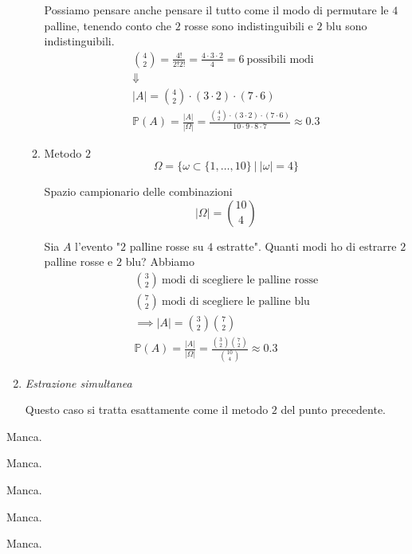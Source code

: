 \begin{enumerate}
\begin{enumerate}
\begin{oss}
Possiamo pensare anche pensare il tutto come il modo di permutare le $4$ palline, tenendo conto che $2$ rosse sono indistinguibili e $2$ blu sono indistinguibili.\begin{gather*}
\binom{4}{2} =\frac{4!}{2!2!} =\frac{4\cdot 3\cdot 2}{4} =6\ \text{possibili modi}\\
\Downarrow \\
| A| =\binom{4}{2} \cdot ( 3\cdot 2) \cdot ( 7\cdot 6)\\
\mathbb{P}( A) =\frac{| A| }{| \Omega | } =\frac{\binom{4}{2} \cdot ( 3\cdot 2) \cdot ( 7\cdot 6)}{10\cdot 9\cdot 8\cdot 7} \approx 0.3
\end{gather*}
\end{oss}
\item Metodo $2$\begin{equation*}
\Omega =\{\omega \subset \{1,\dotsc ,10\} \ |\ | \omega | =4\}
\end{equation*}

Spazio campionario delle combinazioni\begin{equation*}
| \Omega | =\binom{10}{4}
\end{equation*}

Sia $A$ l'evento "$2$ palline rosse su $4$ estratte". Quanti modi ho di estrarre $2$ palline rosse e $2$ blu? Abbiamo\begin{gather*}
\binom{3}{2} \ \text{modi di scegliere le palline rosse}\\
\binom{7}{2} \ \text{modi di scegliere le palline blu}\\
\implies | A| =\binom{3}{2}\binom{7}{2}\\
\mathbb{P}( A) =\frac{| A| }{| \Omega | } =\frac{\binom{3}{2}\binom{7}{2}}{\binom{10}{4}} \approx 0.3
\end{gather*}
\end{enumerate}
\item \textit{Estrazione simultanea}

Questo caso si tratta esattamente come il metodo $2$ del punto precedente.
\end{enumerate}
\Soluzione

Manca.
\Soluzione

Manca.
\Soluzione

Manca.
\Soluzione

Manca.
\Soluzione

Manca.
\Soluzione

